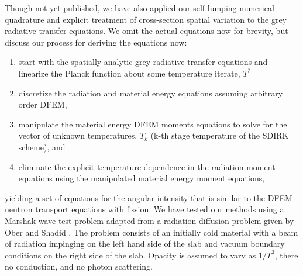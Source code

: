\documentclass[final,3p,times]{elsarticle}
\newcommand{\benum}{\begin{equation}} 			%
\newcommand{\eenum}{\end{equation}}
\newcommand{\beanum}{\begin{eqnarray}}  %
\newcommand{\eeanum}{\end{eqnarray}}
\newcommand{\eqt}[1]{Eq. (\ref{#1})}  %
\newcommand{\B}[1]{\ensuremath{\mathbf{B_{#1} }}}
\newcommand{\M}{\ensuremath{ \mathbf M}}
\newcommand{\Mw}{\ensuremath{\widehat{\mathbf M}}}
\newcommand{\pec}{\, ,}
\newcommand{\pep}{\, .}
\begin{document}
Though not yet published, we have also applied our self-lumping numerical quadrature and explicit treatment of cross-section spatial variation to the grey radiative transfer equations.
We omit the actual equations now for brevity, but discuss our process for deriving the equations now:
\begin{enumerate}
\item start with the spatially analytic grey radiative transfer equations and linearize the Planck function about some temperature iterate, $T^*$
\item discretize the radiation and material energy equations assuming arbitrary order DFEM,
\item manipulate the material energy DFEM moments equations to solve for the vector of unknown temperatures, $T_k$ (k-th stage temperature of the SDIRK scheme), and
\item eliminate the explicit temperature dependence in the radiation moment equations using the manipulated material energy moment equations, 
\end{enumerate}
yielding a set of equations for the angular intensity that is similar to the DFEM neutron transport equations with fission.
We have tested our methods using a Marshak wave test problem adapted from a radiation diffusion problem given by Ober and Shadid \cite{ober_shadid}.
The problem consists of an initially cold material with a beam of radiation impinging on the left hand side of the slab and vacuum boundary conditions on the right side of the slab.
Opacity is assumed to vary as $1/T^3$, there no conduction, and no photon scattering.
\end{document}
